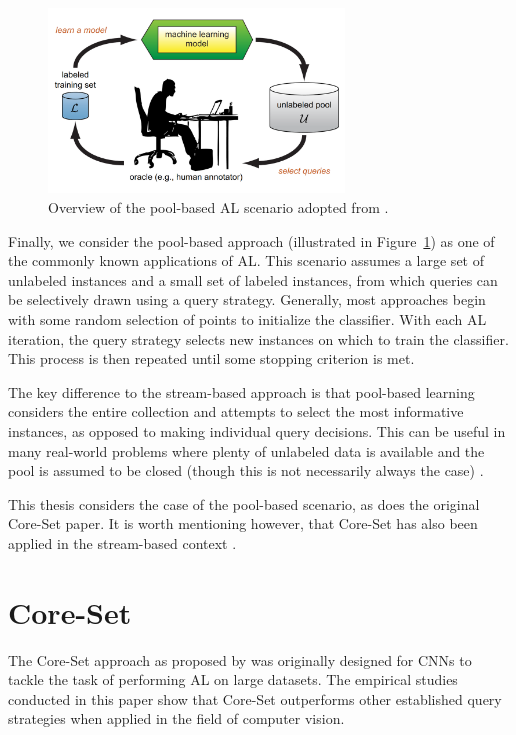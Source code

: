 \documentclass[english,bachelor,ul]{webisthesis} %
\begin{document}
\begin{figure}[htbp]
    \centering
    \includegraphics[width=0.7\textwidth]{img/al.png}
    \caption{Overview of the pool-based AL scenario adopted from \cite{settles.tr09}.}
    \label{fig:activelearning}
\end{figure}

Finally, we consider the pool-based approach (illustrated in Figure~\ref{fig:activelearning}) as one of the commonly known applications of AL. This scenario assumes a large set of unlabeled instances and a small set of labeled instances, from which queries can be selectively drawn using a query strategy. Generally, most approaches begin with some random selection of points to initialize the classifier. With each AL iteration, the query strategy selects new instances on which to train the classifier. This process is then repeated until some stopping criterion is met. 

The key difference to the stream-based approach is that pool-based learning considers the entire collection and attempts to select the most informative instances, as opposed to making individual query decisions. This can be useful in many real-world problems where plenty of unlabeled data is available and the pool is assumed to be closed (though this is not necessarily always the case) \citep{settles.tr09}.

This thesis considers the case of the pool-based scenario, as does the original Core-Set paper. It is worth mentioning however, that Core-Set has also been applied in the stream-based context \citep{DBLP:conf/icml/SaranYK0A23}.

\section{Core-Set}

The Core-Set approach as proposed by \cite{DBLP:conf/iclr/SenerS18} was originally designed for CNNs to tackle the task of performing AL on large datasets. The empirical studies conducted in this paper show that Core-Set outperforms other established query strategies when applied in the field of computer vision.
\end{document}
